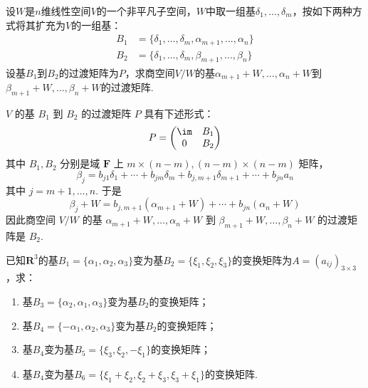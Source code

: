 \begin{exercise}
\begin{exgroup}
        \item 设$W$是$n$维线性空间$V$的一个非平凡子空间，$W$中取一组基$\delta_1,\ldots,\delta_m$，按如下两种方式将其扩充为$V$的一组基：
        \begin{align*}
            B_1 & =\{\delta_1,\ldots,\delta_m,\alpha_{m+1},\ldots,\alpha_n\} \\
            B_2 & =\{\delta_1,\ldots,\delta_m,\beta_{m+1},\ldots,\beta_n\}
        \end{align*}
        设基$B_1$到$B_2$的过渡矩阵为$P$，求商空间$V/W$的基$\alpha_{m+1}+W,\ldots,\alpha_n+W$到$\beta_{m+1}+W,\ldots,\beta_n+W$的过渡矩阵.
        \begin{answer}
            $V$ 的基 $B_1$ 到 $B_2$ 的过渡矩阵 $P$ 具有下述形式：
          \[P=\begin{pmatrix}\im & B_1 \\ 0 & B_2\end{pmatrix}\]
          其中 $B_1,B_2$ 分别是域 $\mathbf{F}$ 上 $m\times (n-m),(n-m)\times (n-m)$ 矩阵，
          \[\beta_j=b_{j1}\delta_1+\cdots+b_{jm}\delta_m+b_{j,m+1}\delta_{m+1}+\cdots+b_{jn}a_n\]
          其中 $j=m+1,\ldots,n$. 于是
          \[\beta_j+W=b_{j,m+1}(\alpha_{m+1}+W)+\cdots+b_{jn}(\alpha_n+W)\]
          因此商空间 $V/W$ 的基 $\alpha_{m+1}+W,\ldots,\alpha_n+W$ 到 $\beta_{m+1}+W,\ldots,\beta_n+W$ 的过渡矩阵是 $B_2$.
        \end{answer}

        \item 已知$\mathbf{R}^3$的基$B_1=\{\alpha_1,\alpha_2,\alpha_3\}$变为基$B_2=\{\xi_1,\xi_2,\xi_3\}$的变换矩阵为$A=(a_{ij})_{3 \times 3}$，求：
        \begin{enumerate}
            \item 基$B_3=\{\alpha_2,\alpha_1,\alpha_3\}$变为基$B_2$的变换矩阵；

            \item 基$B_4=\{-\alpha_1,\alpha_2,\alpha_3\}$变为基$B_2$的变换矩阵；

            \item 基$B_4$变为基$B_5=\{\xi_3,\xi_2,-\xi_1\}$的变换矩阵；

            \item 基$B_4$变为基$B_6=\{\xi_1+\xi_2,\xi_2+\xi_3,\xi_3+\xi_1\}$的变换矩阵.
        \end{enumerate}


\end{exgroup}
\end{exercise}
